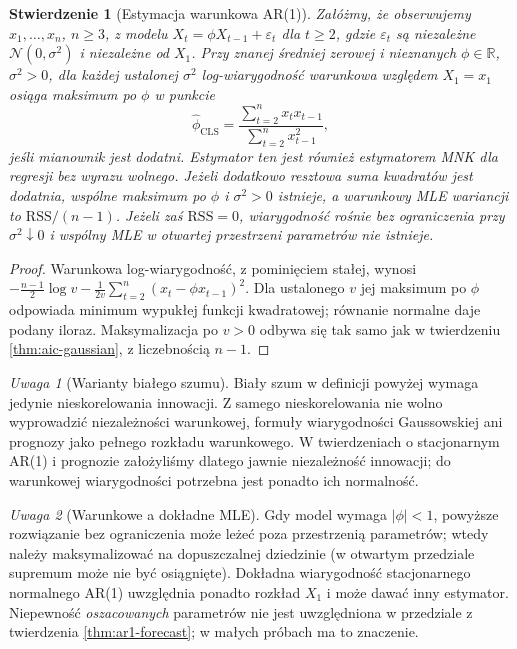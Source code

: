 \documentclass[11pt,a4paper,oneside]{report}
\numberwithin{equation}{chapter}
\theoremstyle{plain}
\newtheorem{stwierdzenie}[twierdzenie]{Stwierdzenie}
\theoremstyle{definition}
\theoremstyle{remark}
\newtheorem{uwaga}{Uwaga}[chapter]
\newcommand{\R}{\mathbb R}
\begin{document}
\begin{stwierdzenie}[Estymacja warunkowa AR(1)]
\label{prop:ar1-conditional-mle}
Załóżmy, że obserwujemy $x_1,\ldots,x_n$, $n\ge3$,
z modelu $X_t=\phi X_{t-1}+\varepsilon_t$ dla $t\ge2$,
gdzie $\varepsilon_t$ są niezależne
$\mathcal N(0,\sigma^2)$ i niezależne od $X_1$.
Przy znanej średniej zerowej i nieznanych
$\phi\in\R$, $\sigma^2>0$, dla każdej ustalonej
$\sigma^2$ log-wiarygodność warunkowa względem $X_1=x_1$
osiąga maksimum po $\phi$ w punkcie
\[
 \widehat\phi_{\mathrm{CLS}}=
 \frac{\sum_{t=2}^n x_tx_{t-1}}{\sum_{t=2}^n x_{t-1}^2},
\]
jeśli mianownik jest dodatni. Estymator ten jest
również estymatorem MNK dla regresji bez wyrazu wolnego.
Jeżeli dodatkowo resztowa suma kwadratów jest dodatnia,
wspólne maksimum po $\phi$ i $\sigma^2>0$ istnieje,
a warunkowy MLE wariancji to $\mathrm{RSS}/(n-1)$.
Jeżeli zaś $\mathrm{RSS}=0$, wiarygodność rośnie
bez ograniczenia przy $\sigma^2\downarrow0$ i wspólny MLE
w otwartej przestrzeni parametrów nie istnieje.
\end{stwierdzenie}
\begin{proof}
Warunkowa log-wiarygodność, z pominięciem stałej,
wynosi $-\frac{n-1}{2}\log v-
\frac{1}{2v}\sum_{t=2}^n(x_t-\phi x_{t-1})^2$.
Dla ustalonego $v$ jej maksimum po $\phi$ odpowiada
minimum wypukłej funkcji kwadratowej; równanie
normalne daje podany iloraz. Maksymalizacja po
$v>0$ odbywa się tak samo jak w twierdzeniu
\ref{thm:aic-gaussian}, z liczebnością $n-1$.
\end{proof}

\begin{uwaga}[Warianty białego szumu]
Biały szum w definicji powyżej wymaga jedynie nieskorelowania
innowacji. Z samego nieskorelowania nie wolno wyprowadzić
niezależności warunkowej, formuły wiarygodności Gaussowskiej
ani prognozy jako pełnego rozkładu warunkowego. W twierdzeniach
o stacjonarnym AR(1) i prognozie założyliśmy dlatego
jawnie niezależność innowacji; do warunkowej wiarygodności
potrzebna jest ponadto ich normalność.
\end{uwaga}

\begin{uwaga}[Warunkowe a dokładne MLE]
Gdy model wymaga $|\phi|<1$, powyższe rozwiązanie
bez ograniczenia może leżeć poza przestrzenią parametrów;
wtedy należy maksymalizować na dopuszczalnej dziedzinie
(w otwartym przedziale supremum może nie być osiągnięte).
Dokładna wiarygodność stacjonarnego normalnego AR(1)
uwzględnia ponadto rozkład $X_1$ i może dawać inny
estymator. Niepewność \emph{oszacowanych} parametrów
nie jest uwzględniona w przedziale z twierdzenia
\ref{thm:ar1-forecast}; w małych próbach ma to znaczenie.
\end{uwaga}
\end{document}
